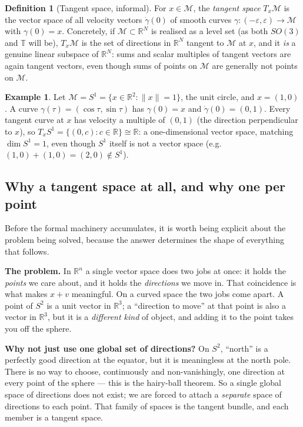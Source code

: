 \documentclass[11pt,a4paper]{report}
\theoremstyle{definition}
\newtheorem{definition}[definition]{Definition}
\newtheorem{example}[example]{Example}
\theoremstyle{remark}
\newcommand{\RR}{\mathbb R}
\newcommand{\eps}{\varepsilon}
\begin{document}
\begin{definition}[Tangent space, informal]
\label{def:tangent-scratch}
For $x\in\mathcal M$, the \emph{tangent space} $T_x\mathcal M$ is the vector
space of all velocity vectors $\dot\gamma(0)$ of smooth curves
$\gamma:(-\eps,\eps)\to\mathcal M$ with $\gamma(0)=x$. Concretely, if
$\mathcal M\subset\RR^N$ is realised as a level set (as both $SO(3)$ and
$\mathbb T$ will be), $T_x\mathcal M$ is the set of directions in $\RR^N$
tangent to $\mathcal M$ at $x$, and it \emph{is} a genuine linear subspace of
$\RR^N$: sums and scalar multiples of tangent vectors are again tangent
vectors, even though sums of points on $\mathcal M$ are generally not points
on $\mathcal M$.
\end{definition}

\begin{example}
Let $\mathcal M=S^1=\{x\in\RR^2:\|x\|=1\}$, the unit circle, and $x=(1,0)$.
A curve $\gamma(\tau)=(\cos\tau,\sin\tau)$ has $\gamma(0)=x$ and
$\dot\gamma(0)=(0,1)$. Every tangent curve at $x$ has velocity a multiple of
$(0,1)$ (the direction perpendicular to $x$), so
$T_xS^1=\{(0,c):c\in\RR\}\cong\RR$: a one-dimensional vector space, matching
$\dim S^1=1$, even though $S^1$ itself is not a vector space (e.g.\
$(1,0)+(1,0)=(2,0)\notin S^1$).
\end{example}

\subsection{Why a tangent space at all, and why one per point}
\label{sec:why-tangent}

Before the formal machinery accumulates, it is worth being explicit about the
problem being solved, because the answer determines the shape of everything
that follows.

\textbf{The problem.} In $\RR^n$ a single vector space does two jobs at once:
it holds the \emph{points} we care about, and it holds the \emph{directions}
we move in. That coincidence is what makes $x+v$ meaningful. On a curved
space the two jobs come apart. A point of $S^2$ is a unit vector in $\RR^3$;
a ``direction to move'' at that point is also a vector in $\RR^3$, but it is
a \emph{different kind} of object, and adding it to the point takes you off
the sphere.

\textbf{Why not just use one global set of directions?} On $S^2$, ``north''
is a perfectly good direction at the equator, but it is meaningless at the
north pole. There is no way to choose, continuously and non-vanishingly, one
direction at every point of the sphere --- this is the hairy-ball theorem.
So a single global space of directions does not exist; we are forced to
attach a \emph{separate} space of directions to each point. That family of
spaces is the tangent bundle, and each member is a tangent space.
\end{document}
